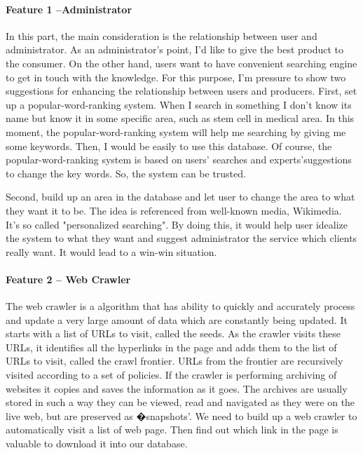 \paragraph*{Feature 1 --Administrator}
\label{task1:part1}

In this part, the main consideration is the relationship between user and administrator. As an administrator's point, I'd like to give the best product to the consumer. On the other hand, users want to have convenient searching engine to get in touch with the knowledge. For this purpose, I'm pressure to show two suggestions for enhancing the relationship between users and producers. First, set up a popular-word-ranking system. When I search in something I don't know its name but know it in some specific area, such as stem cell in medical area. In this moment, the popular-word-ranking system will help me searching by giving me some keywords. Then, I would be easily to use this database. Of course, the popular-word-ranking system is based on users' searches and experts'suggestions to change the key words. So, the system can be trusted. 
	
Second, build up an area in the database and let user to change the area to what they want it to be. The idea is referenced from well-known media, Wikimedia. It's so called "personalized searching". By doing this, it would help user idealize the system to what they want and suggest administrator the service which clients really want. It would lead to a win-win situation.
	
\paragraph*{Feature 2 -- Web Crawler}
\label{task1:feature2}
	
The web crawler is a algorithm that has ability to quickly and accurately process and update a very large amount of data which are constantly being updated.\cite{Liu2012} It starts with a list of URLs to visit, called the seeds. As the crawler visits these URLs, it identifies all the hyperlinks in the page and adds them to the list of URLs to visit, called the crawl frontier. URLs from the frontier are recursively visited according to a set of policies. If the crawler is performing archiving of websites it copies and saves the information as it goes. The archives are usually stored in such a way they can be viewed, read and navigated as they were on the live web, but are preserved as �snapshots'.\cite{Du2013} We need to build up a web crawler to automatically visit a list of web page. Then find out which link in the page is valuable to download it into our database. 
	
